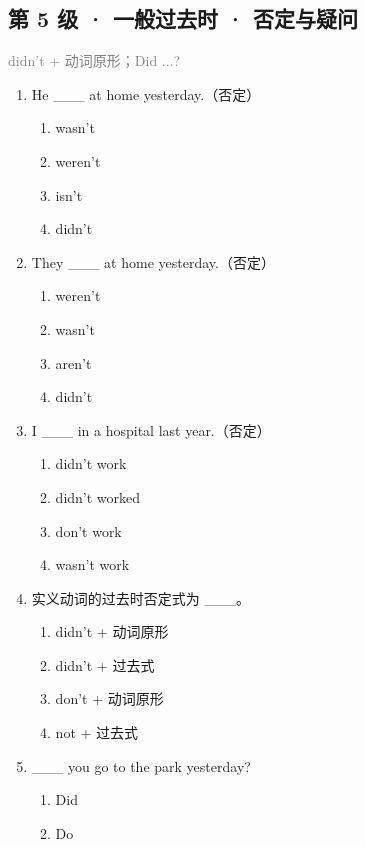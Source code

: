\documentclass[11pt,a4paper]{ctexart}
\begin{document}
\subsection*{第 5 级 · 一般过去时 · 否定与疑问}
\noindent\textcolor{gray}{didn’t + 动词原形；Did ...?}\par\smallskip
\begin{enumerate}[leftmargin=*,itemsep=4pt]
\item He \_\_\_ at home yesterday.（否定）
\begin{enumerate}[label=\Alph*.,leftmargin=2em,itemsep=1pt,topsep=2pt]
\item wasn’t
\item weren’t
\item isn’t
\item didn’t
\end{enumerate}
\item They \_\_\_ at home yesterday.（否定）
\begin{enumerate}[label=\Alph*.,leftmargin=2em,itemsep=1pt,topsep=2pt]
\item weren’t
\item wasn’t
\item aren’t
\item didn’t
\end{enumerate}
\item I \_\_\_ in a hospital last year.（否定）
\begin{enumerate}[label=\Alph*.,leftmargin=2em,itemsep=1pt,topsep=2pt]
\item didn’t work
\item didn’t worked
\item don’t work
\item wasn’t work
\end{enumerate}
\item 实义动词的过去时否定式为 \_\_\_。
\begin{enumerate}[label=\Alph*.,leftmargin=2em,itemsep=1pt,topsep=2pt]
\item didn’t + 动词原形
\item didn’t + 过去式
\item don’t + 动词原形
\item not + 过去式
\end{enumerate}
\item \_\_\_ you go to the park yesterday?
\begin{enumerate}[label=\Alph*.,leftmargin=2em,itemsep=1pt,topsep=2pt]
\item Did
\item Do

\end{enumerate}
\end{enumerate}
\end{document}
